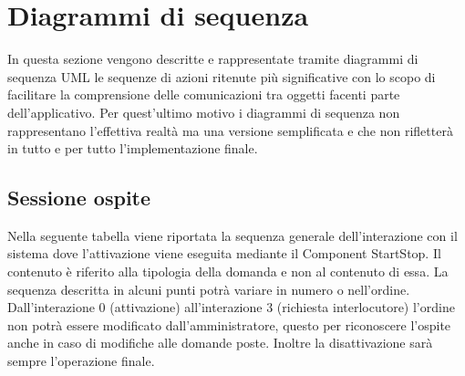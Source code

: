 \documentclass[../DefinizioneDiProdotto_v3.0.0.tex]{subfiles}
\begin{document}
\section{Diagrammi di sequenza}
In questa sezione vengono descritte e rappresentate tramite diagrammi di sequenza UML le sequenze di azioni ritenute più significative con lo scopo di facilitare la comprensione delle comunicazioni tra oggetti facenti parte dell'applicativo. Per quest'ultimo motivo i diagrammi di sequenza non rappresentano l'effettiva realtà ma una versione semplificata e che non rifletterà in tutto e per tutto l'implementazione finale.

\subsection{Sessione ospite}
Nella seguente tabella viene riportata la sequenza generale dell'interazione con il sistema dove l'attivazione viene eseguita mediante il Component StartStop. Il contenuto è riferito alla tipologia della domanda e non al contenuto di essa. La sequenza descritta in alcuni punti potrà variare in numero o nell'ordine. Dall'interazione 0 (attivazione) all'interazione 3 (richiesta interlocutore) l'ordine non potrà essere modificato dall'amministratore, questo per riconoscere l'ospite anche in caso di modifiche alle domande poste. Inoltre la disattivazione sarà sempre l'operazione finale.
\end{document}

